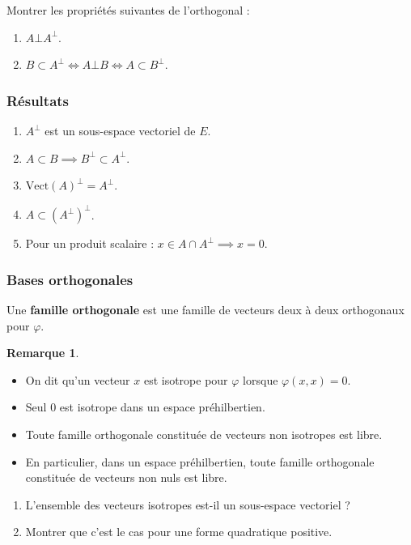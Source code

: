 \documentclass[french]{article}
\theoremstyle{plain}
\theoremstyle{definition}
\newtheorem*{rmq}{Remarque}
\theoremstyle{remark}
\begin{document}
\begin{exo}
	Montrer les propriétés suivantes de l'orthogonal :
	\begin{enumerate}
		\item $A\bot A^\bot$.
		\item $B\subset A^\bot \iff A\bot B\iff A\subset B^\bot$.
	\end{enumerate}
\end{exo}

\subsubsection*{Résultats}

\begin{enumerate}
	\item $A^\bot$ est un sous-espace vectoriel de $E$.
	\item $A\subset B\implies B^\bot\subset A^\bot$.
	\item $\text{Vect}(A)^\bot=A^\bot$.
	\item $A\subset (A^\bot)^\bot$.
	\item Pour un produit scalaire : $x\in A\cap A^\bot\implies x=0$.
\end{enumerate}

\subsubsection*{Bases orthogonales}

\begin{dfn}
	Une \textbf{famille orthogonale} est une famille de vecteurs deux à deux orthogonaux pour $\varphi$.
\end{dfn}

\begin{rmq}
	\begin{itemize}
		\item On dit qu'un vecteur $x$ est isotrope pour $\varphi$ lorsque $\varphi(x,x)=0$.
		\item Seul $0$ est isotrope dans un espace préhilbertien.
		\item Toute famille orthogonale constituée de vecteurs non isotropes est libre.
		\item En particulier, dans un espace préhilbertien, toute famille orthogonale constituée de vecteurs non nuls est libre.
	\end{itemize}
\end{rmq}

\begin{exo}
	\begin{enumerate}
		\item L'ensemble des vecteurs isotropes est-il un sous-espace vectoriel ?
		\item Montrer que c'est le cas pour une forme quadratique positive.
	\end{enumerate}
\end{exo}
\end{document}
